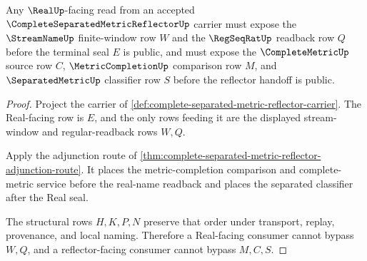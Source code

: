 \begin{theorem}
\label{thm:complete-separated-metric-reflector-real-seal-handoff}
Any $\RealUp$-facing read from an accepted $\CompleteSeparatedMetricReflectorUp$ carrier must expose the $\StreamNameUp$ finite-window row $W$ and the $\RegSeqRatUp$ readback row $Q$ before the terminal seal $E$ is public, and must expose the $\CompleteMetricUp$ source row $C$, $\MetricCompletionUp$ comparison row $M$, and $\SeparatedMetricUp$ classifier row $S$ before the reflector handoff is public.
\end{theorem}
\begin{proof}
Project the carrier of \autoref{def:complete-separated-metric-reflector-carrier}. The Real-facing row is $E$, and the only rows feeding it are the displayed stream-window and regular-readback rows $W,Q$.

Apply the adjunction route of \autoref{thm:complete-separated-metric-reflector-adjunction-route}. It places the metric-completion comparison and complete-metric service before the real-name readback and places the separated classifier after the Real seal.

The structural rows $H,K,P,N$ preserve that order under transport, replay, provenance, and local naming. Therefore a Real-facing consumer cannot bypass $W,Q$, and a reflector-facing consumer cannot bypass $M,C,S$.
\end{proof}




